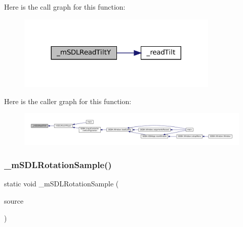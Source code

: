 Here is the call graph for this function\+:
\nopagebreak
\begin{figure}[H]
\begin{center}
\leavevmode
\includegraphics[width=272pt]{sdl-events_8c_a3fac3449468e84b4d3667c7b9468a1c7_cgraph}
\end{center}
\end{figure}
Here is the caller graph for this function\+:
\nopagebreak
\begin{figure}[H]
\begin{center}
\leavevmode
\includegraphics[width=350pt]{sdl-events_8c_a3fac3449468e84b4d3667c7b9468a1c7_icgraph}
\end{center}
\end{figure}
\mbox{\label{sdl-events_8c_af2e60a8e9c3fcba1e6310e13341ab656}} 
\subsubsection{\texorpdfstring{\+\_\+m\+S\+D\+L\+Rotation\+Sample()}{\_mSDLRotationSample()}}
{\footnotesize\ttfamily static void \+\_\+m\+S\+D\+L\+Rotation\+Sample (\begin{DoxyParamCaption}\item[{struct m\+Rotation\+Source $\ast$}]{source }\end{DoxyParamCaption})\hspace{0.3cm}{\ttfamily [static]}}

